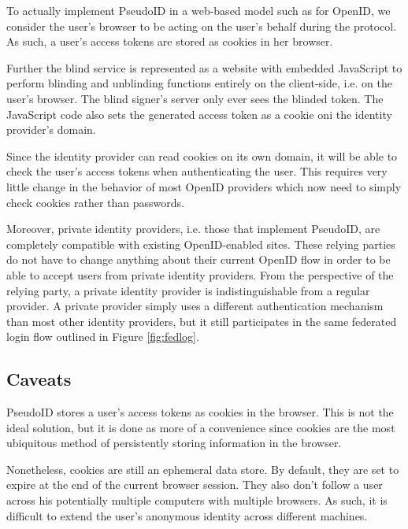 \documentclass{llncs}
\begin{document}
To actually implement PseudoID in a web-based model such as for OpenID, we
consider the user's browser to be acting on the user's behalf during the
protocol. As such, a user's access tokens are stored as cookies in her browser.

Further the blind service is represented as a website with embedded JavaScript
to perform blinding and unblinding functions entirely on the client-side, i.e.
on the user's browser. The blind signer's server only ever sees the blinded
token. The JavaScript code also sets the generated access token as a cookie oni
the identity provider's domain.

Since the identity provider can read cookies on its own domain, it will be able
to check the user's access tokens when authenticating the user. This requires
very little change in the behavior of most OpenID providers which now need to
simply check cookies rather than passwords.

Moreover, private identity providers, i.e. those that implement PseudoID, are
completely compatible with existing OpenID-enabled sites. These relying parties
do not have to change anything about their current OpenID flow in order to be
able to accept users from private identity providers. From the perspective of
the relying party, a private identity provider is indistinguishable from a
regular provider. A private provider simply uses a different authentication
mechanism than most other identity providers, but it still participates in
the same federated login flow outlined in Figure \ref{fig:fedlog}.

\subsection{Caveats}
\label{subsec:caveats}



PseudoID stores a user's access tokens as cookies in the browser. This is not
the ideal solution, but it is done as more of a convenience since cookies are
the most ubiquitous method of persistently storing information in the browser.

Nonetheless, cookies are still an ephemeral data store. By default, they are set
to expire at the end of the current browser session. They also don't follow a
user across his potentially multiple computers with multiple browsers. As
such, it is difficult to extend the user's anonymous identity across different
machines.
\end{document}
